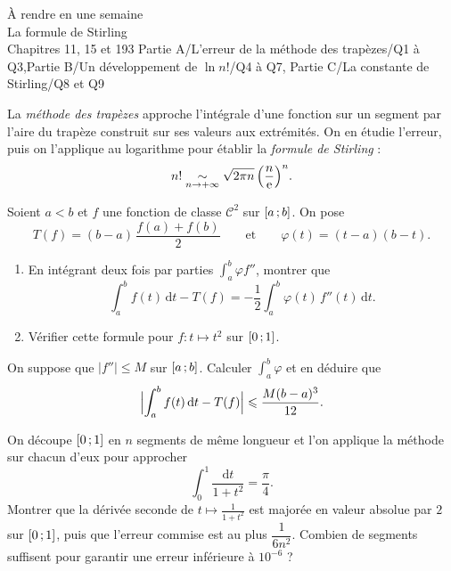 
  {À rendre en une semaine\\La formule de Stirling\\Chapitres 11, 15 et 19}{3}
  {Partie A/L'erreur de la méthode des trapèzes/Q1 à Q3,Partie B/Un développement de $\ln n!$/Q4 à Q7,%
   Partie C/La constante de Stirling/Q8 et Q9}
\enParties
{}

La \emph{méthode des trapèzes} approche l'intégrale d'une fonction sur un
segment par l'aire du trapèze construit sur ses valeurs aux extrémités. On
en étudie l'erreur, puis on l'applique au logarithme pour établir la
\emph{formule de Stirling} :
\[n!\underset{n\to+\infty}{\sim}\sqrt{2\pi n}\,\Bigl(\frac{n}{\mathrm{e}}\Bigr)^{n}.\]

\begin{exoEval}{}{}
Soient $a<b$ et $f$ une fonction de classe $\mathcal{C}^{2}$ sur
$\mathopen{[}a\,{;}\,b\mathclose{]}$. On pose
\[T(f)=(b-a)\,\frac{f(a)+f(b)}{2}\qquad\text{et}\qquad\varphi(t)=(t-a)(b-t).\]
\begin{questions}
  \item \begin{enumerate}[label=\alph*)]
      \item En intégrant deux fois par parties $\int_a^{b}\varphi f''$,
        montrer que
        \[\int_a^{b}f(t)\,\mathrm{d}t-T(f)=-\frac12\int_a^{b}\varphi(t)\,f''(t)\,\mathrm{d}t.\]
      \item Vérifier cette formule pour $f:t\mapsto t^{2}$ sur $\mathopen{[}0\,{;}\,1\mathclose{]}$.
    \end{enumerate}
  \item On suppose que $|f''|\leqslant M$ sur $\mathopen{[}a\,{;}\,b\mathclose{]}$. Calculer
    $\int_a^{b}\varphi$ et en déduire que
    \[\Bigl|\int_a^{b}f(t)\,\mathrm{d}t-T(f)\Bigr|\leqslant\frac{M(b-a)^{3}}{12}.\]
  \item On découpe $\mathopen{[}0\,{;}\,1\mathclose{]}$ en $n$ segments de même longueur et l'on
    applique la méthode sur chacun d'eux pour approcher
    \[\int_0^{1}\frac{\mathrm{d}t}{1+t^{2}}=\frac\pi4.\]
    Montrer que la dérivée seconde de $t\mapsto\frac{1}{1+t^{2}}$ est
    majorée en valeur absolue par $2$ sur $\mathopen{[}0\,{;}\,1\mathclose{]}$, puis que l'erreur
    commise est au plus $\dfrac{1}{6n^{2}}$. Combien de segments suffisent
    pour garantir une erreur inférieure à $10^{-6}$ ?
\end{questions}
\end{exoEval}

